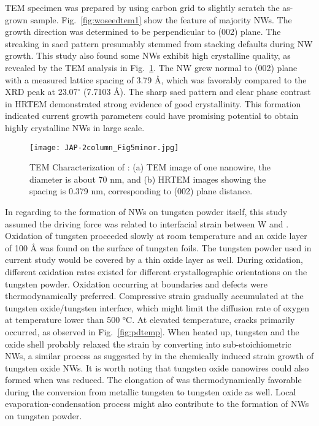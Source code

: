 TEM specimen was prepared by using carbon grid to slightly scratch the as-grown sample. Fig.~\ref{fig:woseedtem1} show the feature of majority NWs. The growth direction was determined to be perpendicular to (002) plane. The streaking in \gls{saed} pattern presumably stemmed from stacking defaults during  NW growth. This study also found some NWs exhibit high crystalline quality, as revealed by the TEM analysis in Fig.~\ref{fig:woseedtem2}. The NW grew normal to (002) plane with a measured lattice spacing of 3.79 \si{\angstrom}, which was favorably compared to the XRD peak at $23.07^\circ$ (7.7103 \si{\angstrom}). The sharp \gls{saed} pattern and clear phase contrast in HRTEM demonstrated strong evidence of good crystallinity. This formation indicated current growth parameters could have promising potential to obtain highly crystalline  NWs in large scale. 

\begin{figure}[htb]
\centering
\texttt{[image: JAP-2column\_Fig5minor.jpg]}
\caption[Characterization of : TEM cont]{TEM Characterization of : (a) TEM image of one nanowire, the diameter is about 70 nm, and (b) HRTEM images showing the spacing is 0.379 nm, corresponding to (002) plane distance.}
\label{fig:woseedtem2}
\end{figure}

In regarding to the formation of NWs on tungsten powder itself, this study assumed the driving force was related to interfacial strain between W and . Oxidation of tungsten proceeded slowly at room temperature and an oxide layer of 100 \si{\angstrom} was found on the surface of tungsten foils.\cite{Warren1996} The tungsten powder used in current study would be covered by a thin oxide layer as well. During oxidation, different oxidation rates existed for different crystallographic orientations on the tungsten powder. Oxidation occurring at boundaries and defects were thermodynamically preferred.\cite{You2010} Compressive strain gradually accumulated at the tungsten oxide/tungsten interface, which might limit the diffusion rate of oxygen at temperature lower than 500 \si{\degreeCelsius}.\cite{tungsten1999} At elevated temperature, cracks primarily occurred, as observed in Fig.~\ref{fig:pdtemp}. When heated up, tungsten and the oxide shell probably relaxed the strain by converting into sub-stoichiometric NWs, a similar process as suggested by \citeauthor{Klinke2005} in the chemically induced strain growth of tungsten oxide NWs.\cite{Klinke2005} It is worth noting that tungsten oxide nanowires could also formed when  was reduced.\cite{Sarin1975} The elongation of  was thermodynamically favorable during the conversion from metallic tungsten to tungsten oxide as well. Local evaporation-condensation process might also contribute to the formation of NWs on tungsten powder.

